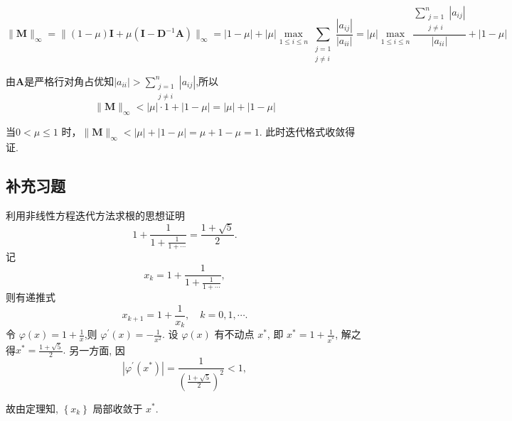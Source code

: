 \begin{tcolorbox}
$$\|\boldsymbol{M}\|_{\infty}=\|(1-\mu) \boldsymbol{I}+\mu( \boldsymbol{I}-\boldsymbol{D}^{-1}\boldsymbol{A})\|_{\infty} =|1-\mu|+|\mu| \max _{1 \leqslant i \leqslant n} \sum_{\substack{j=1 \\ j \neq i}} \frac{\left|a_{i j}\right|}{\left|a_{i i}\right|}=|\mu|\max _{1 \leqslant i \leqslant n} \frac{\sum\limits_{\substack{j=1 \\ j \neq i}}^{n}\left|a_{i j}\right|}{\left|a_{i i}\right|}+|1-\mu|$$

由$\boldsymbol{A}$是严格行对角占优知$|a_{i i}|>\sum\limits_{\substack{j=1 \\ j \neq i}}^{n}\left|a_{i j}\right|$,所以
$$\|\boldsymbol{M}\|_{\infty}<|\mu|\cdot1+|1-\mu|=|\mu|+|1-\mu|$$

当$ 0<\mu \leq 1 $ 时，$\|\boldsymbol{M}\|_{\infty}<|\mu|+|1-\mu|=\mu+1-\mu=1$.
 此时迭代格式收敛得证.
\end{tcolorbox}

\subsection{补充习题}
\begin{tcolorbox}[enhanced,colback=10,colframe=9,breakable,coltitle=green!25!black,title=2024]
  
利用非线性方程迭代方法求根的思想证明
$$
1+\frac{1}{1+\frac{1}{1+\cdots}}=\frac{1+\sqrt{5}}{2} .
$$
\tcblower
 记
$$
x_{k}=1+\frac{1}{1+\frac{1}{1+\cdots}},
$$
则有递推式
$$
x_{k+1}=1+\frac{1}{x_{k}}, \quad k=0,1, \cdots .
$$
令 $ \varphi(x)=1+\frac{1}{x} $,则 $ \varphi^{\prime}(x)=-\frac{1}{x^{2}} $. 设 $ \varphi(x) $ 有不动点 $ x^{*} $, 即 $ x^{*}=1+\frac{1}{x^{*}} $, 解之得$x^{*}=\frac{1+\sqrt{5}}{2}.$
另一方面, 因
$$
\left|\varphi^{\prime}\left(x^{*}\right)\right|=\frac{1}{\left(\frac{1+\sqrt{5}}{2}\right)^{2}}<1,
$$

故由定理知, $ \left\{x_{k}\right\} $ 局部收敛于 $ x^{*} $.
\end{tcolorbox}


